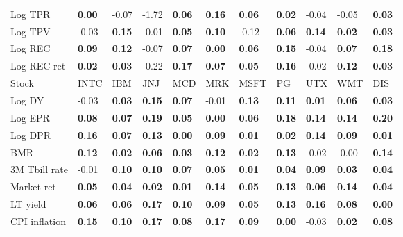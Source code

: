 \begin{table}[h!]
{\begin{center}
\begin{tabularx}{1\textwidth}{@{}X@{\hspace{0.25cm}}l@{\hspace{0.25cm}}l@{\hspace{0.25cm}}l@{\hspace{0.25cm}}l@{\hspace{0.25cm}}l@{\hspace{0.25cm}}l@{\hspace{0.25cm}}l@{\hspace{0.25cm}}l@{\hspace{0.25cm}}l@{\hspace{0.25cm}}l@{}}
\midrule
 Log TPR  & \textbf{0.00}	 & -0.07	 & -1.72	 & \textbf{0.06}	 & \textbf{0.16}	 & \textbf{0.06}	 & \textbf{0.02}	 & -0.04	 & -0.05	 & \textbf{0.03}	\\
 Log TPV  & -0.03	 & \textbf{0.15}	 & -0.01	 & \textbf{0.05}	 & \textbf{0.10}	 & -0.12	 & \textbf{0.06}	 & \textbf{0.14}	 & \textbf{0.02}	 & \textbf{0.03}	\\
 Log REC  & \textbf{0.09}	 & \textbf{0.12}	 & -0.07	 & \textbf{0.07}	 & \textbf{0.00}	 & \textbf{0.06}	 & \textbf{0.15}	 & -0.04	 & \textbf{0.07}	 & \textbf{0.18}	\\
 Log REC ret  & \textbf{0.02}	 & \textbf{0.03}	 & -0.22	 & \textbf{0.17}	 & \textbf{0.07}	 & \textbf{0.05}	 & \textbf{0.16}	 & -0.02	 & \textbf{0.12}	 & \textbf{0.03}	\\
\midrule
\midrule
 Stock  & INTC	 & IBM	 & JNJ	 & MCD	 & MRK	 & MSFT	 & PG	 & UTX	 & WMT	 & DIS	\\
\midrule
 Log DY  & -0.03	 & \textbf{0.03}	 & \textbf{0.15}	 & \textbf{0.07}	 & -0.01	 & \textbf{0.13}	 & \textbf{0.11}	 & \textbf{0.01}	 & \textbf{0.06}	 & \textbf{0.03}	\\
 Log EPR  & \textbf{0.08}	 & \textbf{0.07}	 & \textbf{0.19}	 & \textbf{0.05}	 & \textbf{0.00}	 & \textbf{0.06}	 & \textbf{0.18}	 & \textbf{0.14}	 & \textbf{0.14}	 & \textbf{0.20}	\\
 Log DPR  & \textbf{0.16}	 & \textbf{0.07}	 & \textbf{0.13}	 & \textbf{0.00}	 & \textbf{0.09}	 & \textbf{0.01}	 & \textbf{0.02}	 & \textbf{0.14}	 & \textbf{0.09}	 & \textbf{0.01}	\\
 BMR  & \textbf{0.12}	 & \textbf{0.02}	 & \textbf{0.06}	 & \textbf{0.03}	 & \textbf{0.12}	 & \textbf{0.02}	 & \textbf{0.13}	 & -0.02	 & -0.00	 & \textbf{0.14}	\\
\midrule
 3M Tbill rate  & -0.01	 & \textbf{0.10}	 & \textbf{0.10}	 & \textbf{0.07}	 & \textbf{0.05}	 & \textbf{0.01}	 & \textbf{0.04}	 & \textbf{0.09}	 & \textbf{0.03}	 & \textbf{0.04}	\\
 Market ret  & \textbf{0.05}	 & \textbf{0.04}	 & \textbf{0.02}	 & \textbf{0.01}	 & \textbf{0.14}	 & \textbf{0.05}	 & \textbf{0.13}	 & \textbf{0.06}	 & \textbf{0.14}	 & \textbf{0.04}	\\
 LT yield  & \textbf{0.06}	 & \textbf{0.06}	 & \textbf{0.17}	 & \textbf{0.10}	 & \textbf{0.09}	 & \textbf{0.05}	 & \textbf{0.13}	 & \textbf{0.16}	 & \textbf{0.08}	 & \textbf{0.00}	\\
 CPI inflation  & \textbf{0.15}	 & \textbf{0.10}	 & \textbf{0.17}	 & \textbf{0.08}	 & \textbf{0.17}	 & \textbf{0.09}	 & \textbf{0.00}	 & -0.03	 & \textbf{0.02}	 & \textbf{0.08}	\\

\end{tabularx}
\end{center}}
\end{table}
